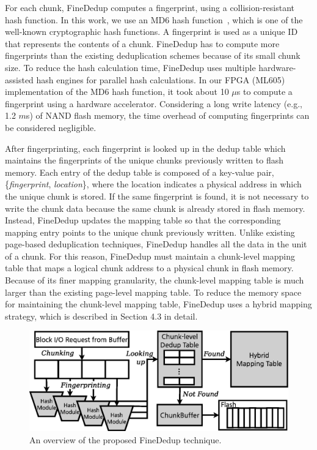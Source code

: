 For each chunk, FineDedup computes a fingerprint, using a collision-resistant hash function.
In this work, we use an MD6 hash function~\cite{md6}, which is one of the well-known cryptographic hash functions.
A fingerprint is used as a unique ID that represents the contents of a chunk.
FineDedup has to compute more fingerprints than the existing deduplication schemes
because of its small chunk size.
To reduce the hash calculation time,
FineDedup uses multiple hardware-assisted hash engines for parallel hash calculations. 
In our FPGA (ML605) implementation of the MD6 hash function, it took about 10 $\mu$s to compute a fingerprint using a hardware accelerator.
Considering a long write latency (e.g., 1.2 $m$s) of NAND flash memory,
the time overhead of computing fingerprints can be considered negligible.

After fingerprinting, 
each fingerprint is looked up in the dedup table
which maintains the fingerprints of the unique chunks previously written to flash memory.
Each entry of the dedup table is composed of a key-value pair, \{\textit{fingerprint}, \textit{location}\},
where the location indicates a physical address in which the unique chunk is stored.
If the same fingerprint is found,
it is not necessary to write the chunk data
because the same chunk is already stored in flash memory.
Instead, FineDedup updates the mapping table 
so that the corresponding mapping entry points to the unique chunk previously written.
Unlike existing page-based deduplication techniques,
FineDedup handles all the data in the unit of a chunk.
For this reason, FineDedup must maintain a chunk-level mapping table
that maps a logical chunk address to a physical chunk in flash memory.
Because of its finer mapping granularity,
the chunk-level mapping table is much larger than the existing page-level mapping table.
To reduce the memory space for maintaining the chunk-level mapping table,
FineDedup uses a hybrid mapping strategy,
which is described in Section 4.3 in detail.

\begin{figure}[t]
	\center
	\includegraphics[scale=0.4]{figure/finededup/overview}
	\caption{An overview of the proposed FineDedup technique.} %
	\label{fig:overview}
\end{figure}

